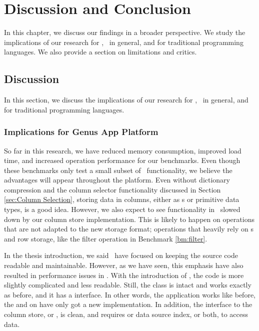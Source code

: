 \chapter{Discussion and Conclusion}
\label{chap:Discussion and Conclusion}
In this chapter, we discuss our findings in a broader perspective. We study the implications of our research for \gap, \mde~in general, and for traditional programming languages. We also provide a section on limitations and critics. 

\clearpage

\section{Discussion}
\label{sec:Discussion}
In this section, we discuss the implications of our research for \gap, \mde~in general, and for traditional programming languages.

\subsection{Implications for Genus App Platform}
\label{sub:Implications for Genus App Platform}
So far in this research, we have reduced memory consumption, improved load time, and increased operation performance for our benchmarks. Even though these benchmarks only test a small subset of \gap~functionality, we believe the advantages will appear throughout the platform. Even without dictionary compression and the column selector functionality discussed in Section \ref{sec:Column Selection}, storing data in columns, either as s or primitive data types, is a good idea. However, we also expect to see functionality in \gap~slowed down by our column store implementation. This is likely to happen on operations that are not adapted to the new storage format; operations that heavily rely on s and row storage, like the filter operation in Benchmark \ref{bm:filter}.

In the thesis introduction, we said \genus~have focused on keeping the source code readable and maintainable. However, as we have seen, this emphasis have also resulted in performance issues in \gap. With the introduction of , the code is more slightly complicated and less readable. Still, the  class is intact and works exactly as before, and it has a  interface. In other words, the application works like before, the  and  on  have only got a new implementation. In addition, the interface to the column store, or , is clean, and requires  or data source index, or both, to access data.

